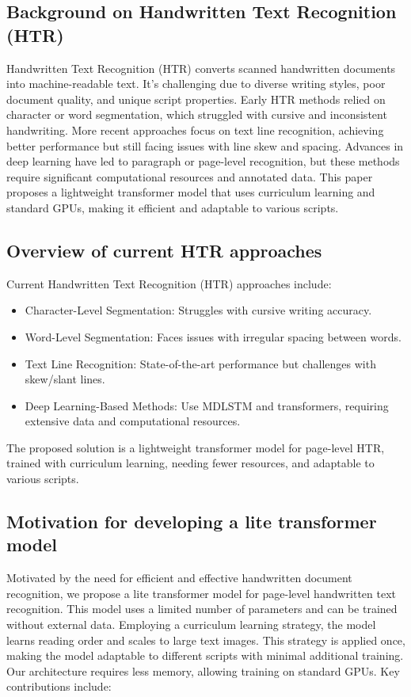 \documentclass{article}
\begin{document}
\subsection{Background on Handwritten Text Recognition (HTR)}
Handwritten Text Recognition (HTR) converts scanned handwritten documents into machine-readable text. It's challenging due to diverse writing styles, poor document quality, and unique script properties. Early HTR methods relied on character or word segmentation, which struggled with cursive and inconsistent handwriting. More recent approaches focus on text line recognition, achieving better performance but still facing issues with line skew and spacing. Advances in deep learning have led to paragraph or page-level recognition, but these methods require significant computational resources and annotated data. This paper proposes a lightweight transformer model that uses curriculum learning and standard GPUs, making it efficient and adaptable to various scripts.

\subsection{Overview of current HTR approaches}
Current Handwritten Text Recognition (HTR) approaches include:
    \begin{itemize}
        \item Character-Level Segmentation: Struggles with cursive writing accuracy.
        \item Word-Level Segmentation: Faces issues with irregular spacing between words.
        \item Text Line Recognition: State-of-the-art performance but challenges with skew/slant lines.
        \item Deep Learning-Based Methods: Use MDLSTM and transformers, requiring extensive data and computational resources. 
    \end{itemize}
The proposed solution is a lightweight transformer model for page-level HTR, trained with curriculum learning, needing fewer resources, and adaptable to various scripts.

\subsection{Motivation for developing a lite transformer model}
Motivated by the need for efficient and effective handwritten document recognition, we propose a lite transformer model for page-level handwritten text recognition. This model uses a limited number of parameters and can be trained without external data. Employing a curriculum learning strategy, the model learns reading order and scales to large text images. This strategy is applied once, making the model adaptable to different scripts with minimal additional training. Our architecture requires less memory, allowing training on standard GPUs. Key contributions include:
    
\end{document}
